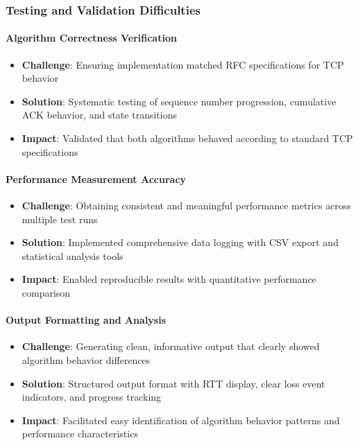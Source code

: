 \documentclass[12pt]{article}
\begin{document}
\subsubsection{Testing and Validation Difficulties}

\paragraph{Algorithm Correctness Verification}
\begin{itemize}
    \item \textbf{Challenge}: Ensuring implementation matched RFC specifications for TCP behavior
    \item \textbf{Solution}: Systematic testing of sequence number progression, cumulative ACK behavior, and state transitions
    \item \textbf{Impact}: Validated that both algorithms behaved according to standard TCP specifications
\end{itemize}

\paragraph{Performance Measurement Accuracy}
\begin{itemize}
    \item \textbf{Challenge}: Obtaining consistent and meaningful performance metrics across multiple test runs
    \item \textbf{Solution}: Implemented comprehensive data logging with CSV export and statistical analysis tools
    \item \textbf{Impact}: Enabled reproducible results with quantitative performance comparison
\end{itemize}

\paragraph{Output Formatting and Analysis}
\begin{itemize}
    \item \textbf{Challenge}: Generating clean, informative output that clearly showed algorithm behavior differences
    \item \textbf{Solution}: Structured output format with RTT display, clear loss event indicators, and progress tracking
    \item \textbf{Impact}: Facilitated easy identification of algorithm behavior patterns and performance characteristics
\end{itemize}
\end{document}

